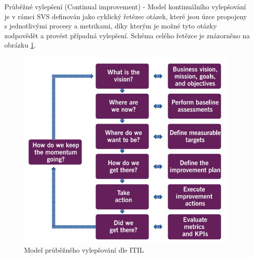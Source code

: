\documentclass[
  digital,     %
  twoside,     %
  lof,         %
  lot,         %
]{fithesis4}
\begin{document}
\begin{compactitem}
    \item Průběžné vylepšení (Continual improvement) - Model kontinuálního vylepšování je v rámci SVS definován jako cyklický řetězec otázek, které jsou úzce propojeny s jednotlivými procesy a metrikami, díky kterým je možné tyto otázky zodpovědět a provést případná vylepšení. Schéma celého řetězce je znázorněno na obrázku \ref{fig:svs_continual_improvement}.

    \begin{figure}[b]
        \begin{center}
            \includegraphics[width=11cm]{img/continual_improvement.png}
        \end{center}
        \caption{Model průběžného vylepšování dle ITIL \parencite[s.~24]{Cartlidge2020}}
        \label{fig:svs_continual_improvement}
    \end{figure} 
\end{compactitem}
\end{document}
